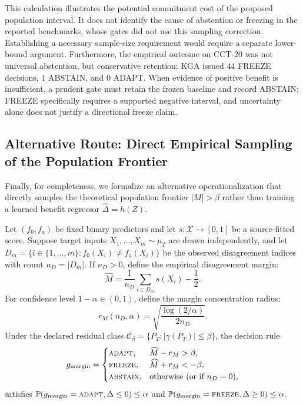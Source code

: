 This calculation illustrates the potential commitment cost of the proposed population interval. It does not
identify the cause of abstention or freezing in the reported benchmarks, whose gates did not use this sampling
correction. Establishing a necessary sample-size requirement would require a separate lower-bound argument.
Furthermore, the empirical outcome on CCT-20 was not universal abstention, but conservative retention:
KGA issued $44$ FREEZE decisions, $1$ ABSTAIN, and $0$ ADAPT. When evidence of positive benefit is insufficient,
a prudent gate must retain the frozen baseline and record ABSTAIN; FREEZE specifically requires a supported
negative interval, and uncertainty alone does not justify a directional freeze claim.

\subsection{Alternative Route: Direct Empirical Sampling of the Population Frontier}
\label{app:direct-sampled-frontier}

Finally, for completeness, we formalize an alternative operationalization that directly samples the theoretical
population frontier $|M| > \beta$ rather than training a learned benefit regressor $\widehat\Delta = h(Z)$.

\begin{proposition}\label{prop:sampled-frontier}
Let $(f_0, f_a)$ be fixed binary predictors and let $s : \mathcal X \to [0, 1]$ be a source-fitted score.
Suppose target inputs $X_1, \dots, X_m \sim \mu_T$ are drawn independently, and let
$D_m = \{i \in \{1, \dots, m\} : f_0(X_i) \neq f_a(X_i)\}$ be the observed disagreement indices with count $n_D = |D_m|$.
If $n_D > 0$, define the empirical disagreement margin:
\begin{equation}
 \widehat M = \frac{1}{n_D} \sum_{i \in D_m} s(X_i) - \frac{1}{2}.
\end{equation}
For confidence level $1 - \alpha \in (0, 1)$, define the margin concentration radius:
\begin{equation}
 r_M(n_D, \alpha) = \sqrt{\frac{\log(2/\alpha)}{2n_D}}.
\end{equation}
Under the declared residual class $\mathcal C_\beta = \{P_T : |\gamma(P_T)| \le \beta\}$, the decision rule
\begin{equation}
 g_{\mathrm{margin}} = \begin{cases}
 \textnormal{\textsc{adapt}}, & \widehat M - r_M > \beta, \\
 \textnormal{\textsc{freeze}}, & \widehat M + r_M < -\beta, \\
 \textnormal{\textsc{abstain}}, & \text{otherwise (or if } n_D = 0\text{)},
 \end{cases}
\end{equation}
satisfies $\mathbb{P}(g_{\mathrm{margin}} = \textnormal{\textsc{adapt}}, \Delta \le 0) \le \alpha$ and $\mathbb{P}(g_{\mathrm{margin}} = \textnormal{\textsc{freeze}}, \Delta \ge 0) \le \alpha$.
\end{proposition}

